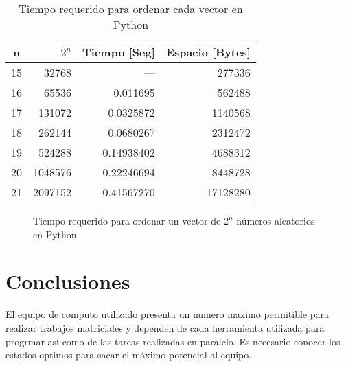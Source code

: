 \documentclass{article}
\begin{document}
\begin{table}[h]
\centering
\begin{tabular}{|c|r|r|r|}
\hline
n  & $2^n$& Tiempo [Seg] & Espacio [Bytes]\\ \hline
15  & 32768                    & ---      &  277336                    \\ \hline
16  & 65536                    & 0.011695 & 562488                           \\ \hline
17  & 131072                   & 0.0325872  & 1140568                        \\ \hline
18  & 262144                   & 0.0680267   &  2312472                        \\ \hline
19  & 524288                   & 0.14938402   & 4688312                           \\ \hline
20  & 1048576                  & 0.22246694  & 8448728                           \\ \hline
21  & 2097152                  & 0.41567270  & 17128280                           \\ \hline
\end{tabular}
\caption{Tiempo requerido para ordenar cada vector en Python}
\label{tabla 2}
\end{table}

\begin{figure}
    \centering 
   
    \caption{Tiempo requerido para ordenar un vector de $2^n$ números aleatorios en Python}
    \label{grafica2}

\end{figure}

\section{Conclusiones}
El equipo de computo utilizado presenta un numero maximo permitible para realizar trabajos matriciales y dependen de cada herramienta utilizada para progrmar así como de las tareas realizadas en paralelo. Es necesario conocer los estados optimos para sacar el máximo potencial al equipo.
\end{document}
